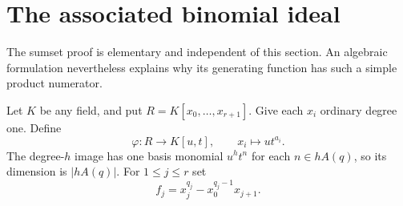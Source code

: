 \documentclass[11pt]{article}
\numberwithin{equation}{section}
\theoremstyle{definition}
\theoremstyle{remark}\newtheorem{remark}[theorem]{Remark}
\begin{document}
\section{The associated binomial ideal}
\label{sec:algebra}

The sumset proof is elementary and independent of this section.  An
algebraic formulation nevertheless explains why its generating function
has such a simple product numerator.

Let $K$ be any field, and put $R=K[x_0,\ldots,x_{r+1}]$.  Give each
$x_i$ ordinary degree one.  Define
\[
 \varphi:R\longrightarrow K[u,t],\qquad x_i\longmapsto u t^{a_i}.
\]
The degree-$h$ image has one basis monomial $u^h t^n$ for each
$n\in hA(q)$, so its dimension is $|hA(q)|$.
For $1\le j\le r$ set
\begin{equation}\label{eq:binomials}
 f_j=x_j^{q_j}-x_0^{q_j-1}x_{j+1}.
\end{equation}
\end{document}
